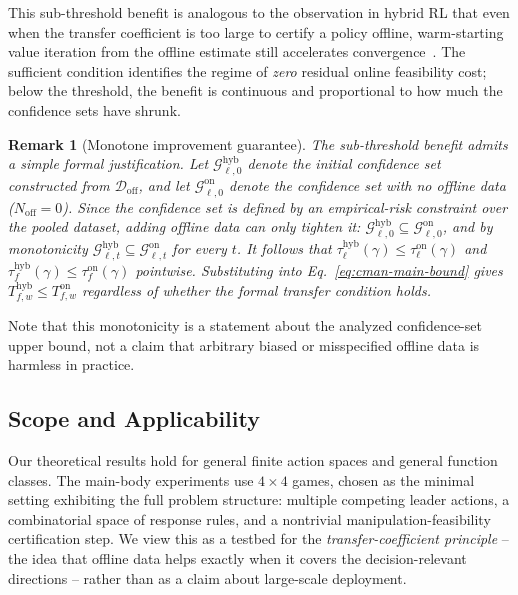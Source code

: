 \documentclass{article}
\newcommand{\cG}{\mathcal{G}}
\newcommand{\cD}{\mathcal{D}}
\newtheorem{remark}[theorem]{Remark}
\begin{document}
This sub-threshold benefit is analogous to the observation in hybrid RL that even when the transfer coefficient is too large to certify a policy offline, warm-starting value iteration from the offline estimate still accelerates convergence~\cite{song2022hybrid}. The sufficient condition identifies the regime of \emph{zero} residual online feasibility cost; below the threshold, the benefit is continuous and proportional to how much the confidence sets have shrunk.

\begin{remark}[Monotone improvement guarantee]
\label{rem:monotone-improvement}
The sub-threshold benefit admits a simple formal justification. Let $\cG_{\ell,0}^{\mathrm{hyb}}$ denote the initial confidence set constructed from $\cD_{\mathrm{off}}$, and let $\cG_{\ell,0}^{\mathrm{on}}$ denote the confidence set with no offline data ($N_{\mathrm{off}}=0$). Since the confidence set is defined by an empirical-risk constraint over the pooled dataset, adding offline data can only tighten it: $\cG_{\ell,0}^{\mathrm{hyb}} \subseteq \cG_{\ell,0}^{\mathrm{on}}$, and by monotonicity $\cG_{\ell,t}^{\mathrm{hyb}} \subseteq \cG_{\ell,t}^{\mathrm{on}}$ for every $t$. It follows that $\tau_\ell^{\mathrm{hyb}}(\gamma) \le \tau_\ell^{\mathrm{on}}(\gamma)$ and $\tau_f^{\mathrm{hyb}}(\gamma) \le \tau_f^{\mathrm{on}}(\gamma)$ pointwise. Substituting into Eq.~\eqref{eq:cman-main-bound} gives $T_{f,w}^{\mathrm{hyb}} \le T_{f,w}^{\mathrm{on}}$ regardless of whether the formal transfer condition holds.
\end{remark}

Note that this monotonicity is a statement about the analyzed confidence-set upper bound, not a claim that arbitrary biased or misspecified offline data is harmless in practice.

\subsection{Scope and Applicability}
\label{app:scope}

Our theoretical results hold for general finite action spaces and general function classes. The main-body experiments use $4\times 4$ games, chosen as the minimal setting exhibiting the full problem structure: multiple competing leader actions, a combinatorial space of response rules, and a nontrivial manipulation-feasibility certification step. We view this as a testbed for the \emph{transfer-coefficient principle} -- the idea that offline data helps exactly when it covers the decision-relevant directions -- rather than as a claim about large-scale deployment.
\end{document}
